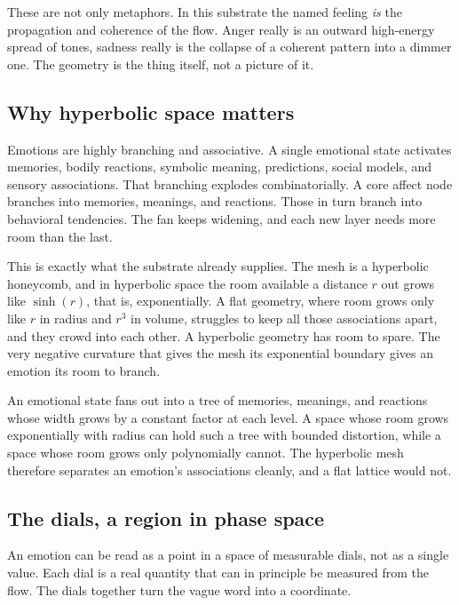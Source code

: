These are not only metaphors. In this substrate the named feeling \emph{is} the propagation and coherence of the flow. Anger really is an outward high-energy spread of tones, sadness really is the collapse of a coherent pattern into a dimmer one. The geometry is the thing itself, not a picture of it.

\subsection{Why hyperbolic space matters}

Emotions are highly branching and associative. A single emotional state activates memories, bodily reactions, symbolic meaning, predictions, social models, and sensory associations. That branching explodes combinatorially. A core affect node branches into memories, meanings, and reactions. Those in turn branch into behavioral tendencies. The fan keeps widening, and each new layer needs more room than the last.

This is exactly what the substrate already supplies. The mesh is a hyperbolic honeycomb, and in hyperbolic space the room available a distance $r$ out grows like $\sinh(r)$, that is, exponentially. A flat geometry, where room grows only like $r$ in radius and $r^{3}$ in volume, struggles to keep all those associations apart, and they crowd into each other. A hyperbolic geometry has room to spare. The very negative curvature that gives the mesh its exponential boundary gives an emotion its room to branch.

\begin{proposition}
An emotional state fans out into a tree of memories, meanings, and reactions whose width grows by a constant factor at each level. A space whose room grows exponentially with radius can hold such a tree with bounded distortion, while a space whose room grows only polynomially cannot. The hyperbolic mesh therefore separates an emotion's associations cleanly, and a flat lattice would not.
\end{proposition}

\subsection{The dials, a region in phase space}

An emotion can be read as a point in a space of measurable dials, not as a single value. Each dial is a real quantity that can in principle be measured from the flow. The dials together turn the vague word into a coordinate.


